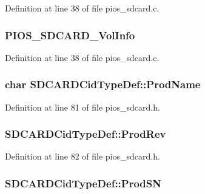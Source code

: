 Definition at line 38 of file pios\-\_\-sdcard.\-c.

\hypertarget{group___p_i_o_s___s_d_c_a_r_d_gaeb82765ef4d7741f373422b30dba4f32}{
\subsubsection[{P\-I\-O\-S\-\_\-\-S\-D\-C\-A\-R\-D\-\_\-\-Vol\-Info}]{ P\-I\-O\-S\-\_\-\-S\-D\-C\-A\-R\-D\-\_\-\-Vol\-Info}}\label{group___p_i_o_s___s_d_c_a_r_d_gaeb82765ef4d7741f373422b30dba4f32}


Definition at line 38 of file pios\-\_\-sdcard.\-c.

\hypertarget{group___p_i_o_s___s_d_c_a_r_d_gab56e4945c8b076a1ea66737cbe18f5ce}{
\subsubsection[{Prod\-Name}]{\setlength{\rightskip}{0pt plus 5cm}char S\-D\-C\-A\-R\-D\-Cid\-Type\-Def\-::\-Prod\-Name}}\label{group___p_i_o_s___s_d_c_a_r_d_gab56e4945c8b076a1ea66737cbe18f5ce}


Definition at line 81 of file pios\-\_\-sdcard.\-h.

\hypertarget{group___p_i_o_s___s_d_c_a_r_d_ga8307b63b043ed01d0fa11493c9508dac}{
\subsubsection[{Prod\-Rev}]{ S\-D\-C\-A\-R\-D\-Cid\-Type\-Def\-::\-Prod\-Rev}}\label{group___p_i_o_s___s_d_c_a_r_d_ga8307b63b043ed01d0fa11493c9508dac}


Definition at line 82 of file pios\-\_\-sdcard.\-h.

\hypertarget{group___p_i_o_s___s_d_c_a_r_d_ga3715cb072043477cb6821ce937c498f8}{
\subsubsection[{Prod\-S\-N}]{ S\-D\-C\-A\-R\-D\-Cid\-Type\-Def\-::\-Prod\-S\-N}}\label{group___p_i_o_s___s_d_c_a_r_d_ga3715cb072043477cb6821ce937c498f8}


